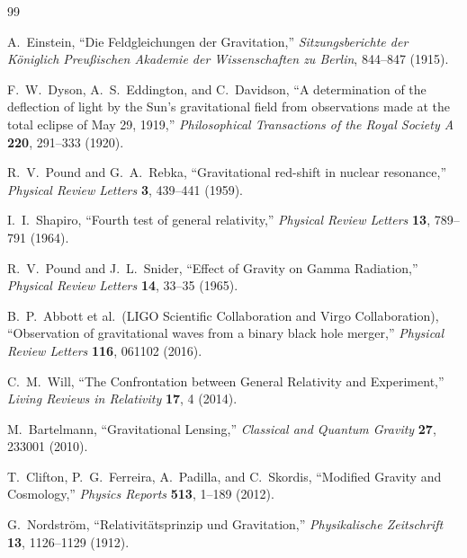 \documentclass[12pt]{article}
\begin{document}
\begin{thebibliography}{99}


A.~Einstein,
``Die Feldgleichungen der Gravitation,''
\textit{Sitzungsberichte der K\"oniglich Preu{\ss}ischen Akademie der
Wissenschaften zu Berlin},
844--847 (1915).

F.~W.~Dyson, A.~S.~Eddington, and C.~Davidson,
``A determination of the deflection of light by the Sun's gravitational
field from observations made at the total eclipse of May 29, 1919,''
\textit{Philosophical Transactions of the Royal Society A}
\textbf{220}, 291--333 (1920).

R.~V.~Pound and G.~A.~Rebka,
``Gravitational red-shift in nuclear resonance,''
\textit{Physical Review Letters} \textbf{3}, 439--441 (1959).

I.~I.~Shapiro,
``Fourth test of general relativity,''
\textit{Physical Review Letters} \textbf{13}, 789--791 (1964).

R.~V.~Pound and J.~L.~Snider,
``Effect of Gravity on Gamma Radiation,''
\textit{Physical Review Letters} \textbf{14}, 33--35 (1965).

B.~P.~Abbott et al.\ (LIGO Scientific Collaboration and Virgo
Collaboration),
``Observation of gravitational waves from a binary black hole merger,''
\textit{Physical Review Letters} \textbf{116}, 061102 (2016).

C.~M.~Will,
``The Confrontation between General Relativity and Experiment,''
\textit{Living Reviews in Relativity} \textbf{17}, 4 (2014).

M.~Bartelmann,
``Gravitational Lensing,''
\textit{Classical and Quantum Gravity} \textbf{27}, 233001 (2010).

T.~Clifton, P.~G.~Ferreira, A.~Padilla, and C.~Skordis,
``Modified Gravity and Cosmology,''
\textit{Physics Reports} \textbf{513}, 1--189 (2012).


G.~Nordstr\"om,
``Relativit\"atsprinzip und Gravitation,''
\textit{Physikalische Zeitschrift} \textbf{13}, 1126--1129 (1912).


\end{thebibliography}
\end{document}
